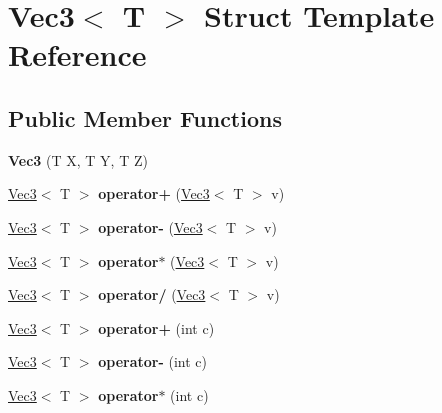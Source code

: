 \hypertarget{struct_vec3}{\section{Vec3$<$ T $>$ Struct Template Reference}
\label{struct_vec3}
}
\subsection*{Public Member Functions}
\begin{DoxyCompactItemize}
\item 
\hypertarget{struct_vec3_ab650e6726f9771b6b06bf6d2b9516d2e}{{\bfseries Vec3} (T X, T Y, T Z)}\label{struct_vec3_ab650e6726f9771b6b06bf6d2b9516d2e}

\item 
\hypertarget{struct_vec3_ac0ab119d341724a005cfada9de0591b7}{\hyperlink{struct_vec3}{Vec3}$<$ T $>$ {\bfseries operator+} (\hyperlink{struct_vec3}{Vec3}$<$ T $>$ v)}\label{struct_vec3_ac0ab119d341724a005cfada9de0591b7}

\item 
\hypertarget{struct_vec3_a15defe71244a0a9e9d1e8fabe5a71080}{\hyperlink{struct_vec3}{Vec3}$<$ T $>$ {\bfseries operator-\/} (\hyperlink{struct_vec3}{Vec3}$<$ T $>$ v)}\label{struct_vec3_a15defe71244a0a9e9d1e8fabe5a71080}

\item 
\hypertarget{struct_vec3_af8c591923940bb51d9b662d1603e612c}{\hyperlink{struct_vec3}{Vec3}$<$ T $>$ {\bfseries operator$\ast$} (\hyperlink{struct_vec3}{Vec3}$<$ T $>$ v)}\label{struct_vec3_af8c591923940bb51d9b662d1603e612c}

\item 
\hypertarget{struct_vec3_abe27f317700cd8aafdefa7353e35e265}{\hyperlink{struct_vec3}{Vec3}$<$ T $>$ {\bfseries operator/} (\hyperlink{struct_vec3}{Vec3}$<$ T $>$ v)}\label{struct_vec3_abe27f317700cd8aafdefa7353e35e265}

\item 
\hypertarget{struct_vec3_a468aad070c6dfa37cb2db4d3c6000f7c}{\hyperlink{struct_vec3}{Vec3}$<$ T $>$ {\bfseries operator+} (int c)}\label{struct_vec3_a468aad070c6dfa37cb2db4d3c6000f7c}

\item 
\hypertarget{struct_vec3_ab75df01d564c317ac776b9672b01fff6}{\hyperlink{struct_vec3}{Vec3}$<$ T $>$ {\bfseries operator-\/} (int c)}\label{struct_vec3_ab75df01d564c317ac776b9672b01fff6}

\item 
\hypertarget{struct_vec3_a61a01ac29570dbbe840653b0e94b6cf7}{\hyperlink{struct_vec3}{Vec3}$<$ T $>$ {\bfseries operator$\ast$} (int c)}\label{struct_vec3_a61a01ac29570dbbe840653b0e94b6cf7}


\end{DoxyCompactItemize}
